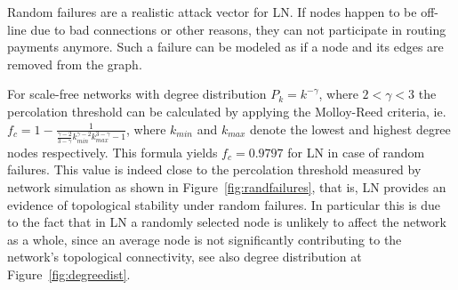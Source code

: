 \documentclass[a4paper]{article}
\theoremstyle{definition}
\begin{document}
Random failures are a realistic attack vector for LN. If nodes happen to be off-line due to bad connections or other reasons, they can not participate in routing payments anymore. Such a failure can be modeled as if a node and its edges are removed from the graph.    

For scale-free networks with degree distribution $P_{k}=k^{-\gamma}$, where $2 < \gamma < 3$ the percolation threshold can be calculated by applying the Molloy-Reed criteria, ie. $f_{c}=1-\frac{1}{\frac{\gamma-2}{3-\gamma}k_{min}^{\gamma-2}k_{max}^{3-\gamma}-1}$, where $k_{min}$ and $k_{max}$ denote the lowest and highest degree nodes respectively. This formula yields $f_c=0.9797$ for LN in case of random failures. This value is indeed close to the percolation threshold measured by network simulation as shown in Figure~\ref{fig:randfailures}, that is, LN provides an evidence of topological stability under random failures. In particular this is due to the fact that in LN a randomly selected node is unlikely to affect the network as a whole, since an average node is not significantly contributing to the network's topological connectivity, see also degree distribution at Figure~\ref{fig:degreedist}. 

\newpage
\end{document}
